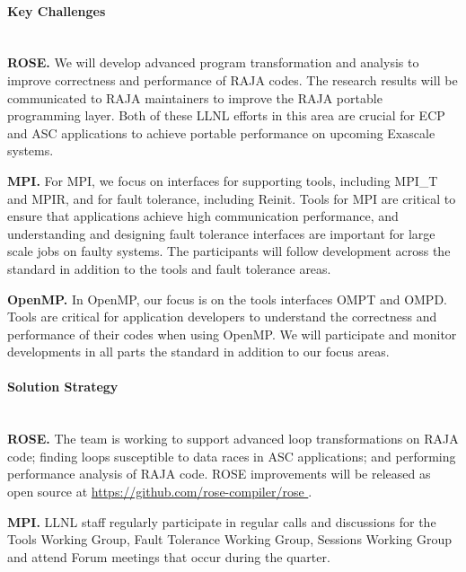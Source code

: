 \paragraph{Key  Challenges} \leavevmode \\

\textbf{ROSE.}
We will develop advanced program 
transformation and analysis to improve correctness and performance of 
RAJA codes. The research results will be communicated to RAJA maintainers to 
improve the RAJA portable programming layer. Both of these LLNL efforts 
in this area  are crucial for ECP and ASC applications to achieve portable 
performance on upcoming Exascale systems.

\textbf{MPI.}
For MPI, we focus on 
interfaces for supporting tools, including MPI\_T and MPIR, and for fault
tolerance, including Reinit. Tools for MPI are critical to ensure that
applications achieve high communication performance, and understanding
and designing fault tolerance interfaces are important for large scale
jobs on faulty systems.
The participants will follow development across the standard in
addition to the tools and fault tolerance areas. 

\textbf{OpenMP.} 
In OpenMP, our focus is on the tools interfaces 
OMPT and OMPD.  Tools are critical for application developers to understand
the correctness and performance of their codes when using OpenMP.
We will participate and monitor developments in 
all parts the standard in addition to our focus areas. 

\paragraph{Solution Strategy} \leavevmode \\
 

\textbf{ROSE.}
The team is working to support advanced loop transformations on RAJA
code; finding loops susceptible to data races in ASC applications;
and performing performance analysis of RAJA code. ROSE improvements
will be released as open source at \url{https://github.com/rose-compiler/rose
}.

\textbf{MPI.}
LLNL staff regularly participate in regular calls and discussions for the Tools Working Group, Fault Tolerance Working Group, Sessions Working Group and attend Forum meetings that occur during the quarter.

